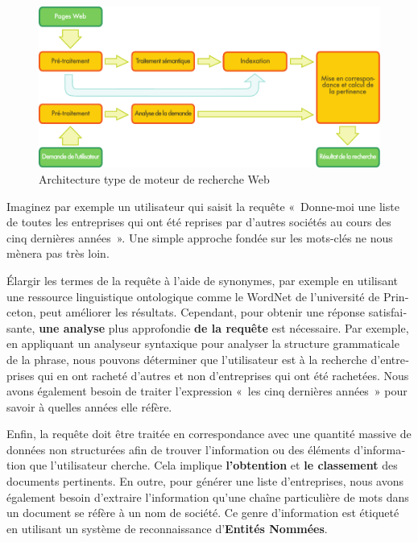 \begin{french}
\begin{multicols}{2}
\begin{figure}[t]
\begin{center}
 \includegraphics[width=\textwidth]{../_media/french/web_search_architecture}
 \caption{Architecture type de moteur de recherche Web}
\label{fig:archiweb}
\end{center}
\end{figure}

Imaginez par exemple un utilisateur qui saisit la requête «~Donne-moi
une liste de toutes les entreprises qui ont été reprises par d'autres
sociétés au cours des cinq dernières années~». Une simple approche
fondée sur les mots-clés ne nous mènera pas très loin.

Élargir les termes de la requête à l'aide de synonymes, par exemple en
utilisant une ressource linguistique ontologique comme le WordNet de
l'université de Princeton, peut améliorer les résultats. Cependant, pour obtenir une
réponse satisfaisante, {\bf une analyse} plus approfondie {\bf de la requête} est
nécessaire. Par exemple, en appliquant un analyseur syntaxique pour
analyser la structure grammaticale de la phrase, nous pouvons
déterminer que l'utilisateur est à la recherche d'entreprises qui en
ont racheté d'autres et non d'entreprises qui ont été rachetées. Nous
avons également besoin de traiter l'expression «~les cinq dernières
  années~» pour savoir à quelles années elle réfère.

Enfin, la requête doit être traitée en correspondance avec une
quantité massive de données non structurées afin de trouver
l'information ou des éléments d'information que l'utilisateur
cherche. Cela implique {\bf l'obtention} et {\bf le classement} des documents
pertinents. En outre, pour générer une liste d'entreprises, nous avons
également besoin d'extraire l'information qu'une chaîne particulière
de mots dans un document se réfère à un nom de société. Ce genre
d'information est étiqueté en utilisant un système de reconnaissance
d'{\bf Entités Nommées}.


\end{multicols}
\end{french}
